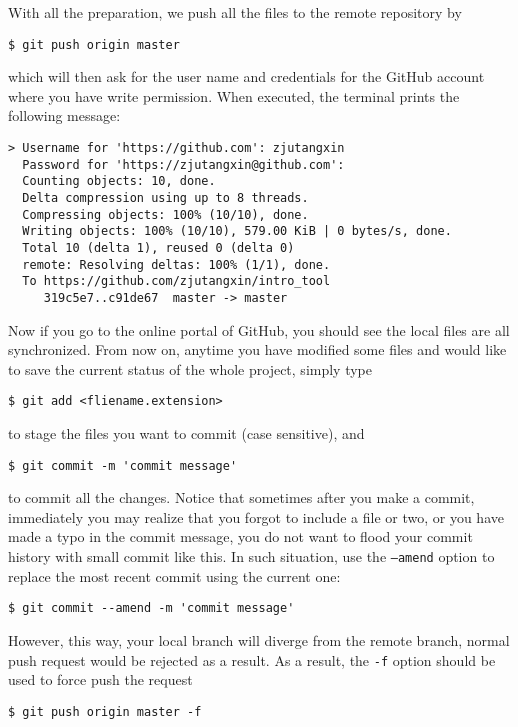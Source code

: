 \documentclass[twoside,12pt,leqno]{article}
\newcommand{\code}{\texttt}
\begin{document}
With all the preparation, we push all the files to the remote repository by
\begin{verbatim}
$ git push origin master
\end{verbatim}
which will then ask for the user name and credentials for the GitHub account where you have write permission. When executed, the terminal prints the following message:
\begin{verbatim}
> Username for 'https://github.com': zjutangxin
  Password for 'https://zjutangxin@github.com':
  Counting objects: 10, done.
  Delta compression using up to 8 threads.
  Compressing objects: 100% (10/10), done.
  Writing objects: 100% (10/10), 579.00 KiB | 0 bytes/s, done.
  Total 10 (delta 1), reused 0 (delta 0)
  remote: Resolving deltas: 100% (1/1), done.
  To https://github.com/zjutangxin/intro_tool
     319c5e7..c91de67  master -> master
\end{verbatim}

Now if you go to the online portal of GitHub, you should see the local files are all synchronized. From now on, anytime you have modified some files and would like to save the current status of the whole project, simply type
\begin{verbatim}
$ git add <fliename.extension>
\end{verbatim}
to stage the files you want to commit (case sensitive), and
\begin{verbatim}
$ git commit -m 'commit message'
\end{verbatim}
to commit all the changes. Notice that sometimes after you make a commit, immediately you may realize that you forgot to include a file or two, or you have made a typo in the commit message, you do not want to flood your commit history with small commit like this. In such situation, use the \code{--amend} option to replace the most recent commit using the current one:
\begin{verbatim}
$ git commit --amend -m 'commit message'
\end{verbatim}
However, this way, your local branch will diverge from the remote branch, normal push request would be rejected as a result. As a result, the \code{-f} option should be used to force push the request
\begin{verbatim}
$ git push origin master -f
\end{verbatim}



\end{document}
